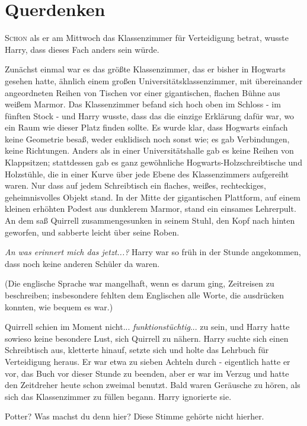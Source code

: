 \chapter{Querdenken}

\lettrine{S}{chon} als er am Mittwoch das Klassenzimmer für Verteidigung betrat,
wusste Harry, dass dieses Fach anders sein würde.

Zunächst einmal war es das größte Klassenzimmer, das er bisher in Hogwarts
gesehen hatte, ähnlich einem großen Universitätsklassenzimmer, mit übereinander
angeordneten Reihen von Tischen vor einer gigantischen, flachen Bühne aus weißem
Marmor. Das Klassenzimmer befand sich hoch oben im Schloss - im fünften Stock -
und Harry wusste, dass das die einzige Erklärung dafür war, wo ein Raum wie
dieser Platz finden sollte. Es wurde klar, dass Hogwarts einfach keine Geometrie
besaß, weder euklidisch noch sonst wie; es gab Verbindungen, keine Richtungen.
Anders als in einer Universitätshalle gab es keine Reihen von Klappsitzen;
stattdessen gab es ganz gewöhnliche Hogwarts-Holzschreibtische und Holzstühle,
die in einer Kurve über jede Ebene des Klassenzimmers aufgereiht waren. Nur dass
auf jedem Schreibtisch ein flaches, weißes, rechteckiges, geheimnisvolles Objekt
stand. In der Mitte der gigantischen Plattform, auf einem kleinen erhöhten
Podest aus dunklerem Marmor, stand ein einsames Lehrerpult. An dem saß Quirrell
zusammengesunken in seinem Stuhl, den Kopf nach hinten geworfen, und sabberte
leicht über seine Roben.

\emph{An was erinnert mich das jetzt...? } Harry war so früh in der Stunde
angekommen, dass noch keine anderen Schüler da waren.

(Die englische Sprache war mangelhaft, wenn es darum ging, Zeitreisen zu
beschreiben; insbesondere fehlten dem Englischen alle Worte, die ausdrücken
konnten, wie bequem es war.)

Quirrell schien im Moment nicht... \emph{funktionstüchtig}... zu sein, und Harry
hatte sowieso keine besondere Lust, sich Quirrell zu nähern. Harry suchte sich
einen Schreibtisch aus, kletterte hinauf, setzte sich und holte das Lehrbuch für
Verteidigung heraus. Er war etwa zu sieben Achteln durch - eigentlich hatte er
vor, das Buch vor dieser Stunde zu beenden, aber er war im Verzug und hatte den
Zeitdreher heute schon zweimal benutzt. Bald waren Geräusche zu hören, als sich
das Klassenzimmer zu füllen begann. Harry ignorierte sie.

\glqq Potter? Was machst du denn hier?\grqq{} Diese Stimme gehörte nicht
hierher.

